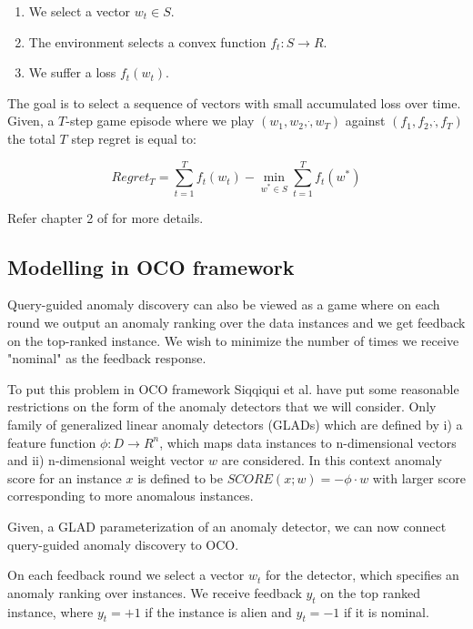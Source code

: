 \begin{enumerate}
    \setlength\itemsep{-0.5em}
    \item We select a vector $w_t \in S$.
    \item The environment selects a convex function $f_t:S \rightarrow R$.
    \item We suffer a loss $f_t(w_t)$.
\end{enumerate}

The goal is to select a sequence of vectors with small accumulated loss over time. 
Given, a $T$-step game episode where we play $(w_1, w_2, \dot , w_T)$ against $(f_1, f_2, \dot,f_T)$ the total $T$ step regret is equal to:

\begin{equation}
    \label{eq:regret}
    Regret_T = \sum_{t=1}^{T} f_t(w_t) - \min_{w^* \in S} \sum_{t=1}^{T} f_t(w^*)
\end{equation}

Refer chapter 2 of \cite{10.1561/2200000018} for more details.

\subsection{Modelling in OCO framework}
\label{subsec:query-guided-anomaly-discovery-as-oco}

Query-guided anomaly discovery can also be viewed as a game
where on each round we output an anomaly ranking over the data
instances and we get feedback on the top-ranked instance. We
wish to minimize the number of times we receive "nominal" as the
feedback response.

To put this problem in OCO framework Siqqiqui et al. \cite{10.1145/3219819.3220083} have put some reasonable restrictions on the form of the anomaly detectors that we will consider.
Only family of generalized linear anomaly detectors (GLADs) which are defined by i) a feature function $\phi : D \rightarrow R^n$, which maps data instances to n-dimensional vectors and ii) n-dimensional weight vector $w$ are considered.
In this context anomaly score for an instance $x$ is defined to be $SCORE(x;w) = - \phi \cdot w$ with larger score corresponding to more anomalous instances.


Given, a GLAD parameterization of an anomaly detector, we can now connect query-guided anomaly discovery to OCO\@.

On each feedback round we select a vector $w_t$ for the detector, which specifies an anomaly ranking over instances. 
We receive feedback $y_t$ on the top ranked instance, where $y_t = +1$ if the instance is alien and $y_t = -1$ if it is nominal.

